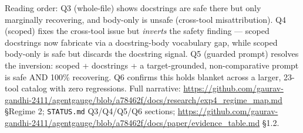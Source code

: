\begin{itemize}
  Reading order: Q3 (whole-file) shows docstrings are safe there but
  only marginally recovering, and body-only is unsafe (cross-tool
  misattribution). Q4 (scoped) fixes the cross-tool issue but
  \emph{inverts} the safety finding --- scoped docstrings now fabricate
  via a docstring-body vocabulary gap, while scoped body-only is safe
  but discards the docstring signal. Q5 (guarded prompt) resolves the
  inversion: scoped + docstrings + a target-grounded, non-comparative
  prompt is safe AND 100\% recovering. Q6 confirms this holds blanket
  across a larger, 23-tool catalog with zero regressions. Full
  narrative:
  \url{https://github.com/gaurav-gandhi-2411/agentgauge/blob/a78462f/docs/research/exp4_regime_map.md}
  §Regime 2; \texttt{STATUS.md} Q3/Q4/Q5/Q6 sections;
  \url{https://github.com/gaurav-gandhi-2411/agentgauge/blob/a78462f/docs/paper/evidence_table.md}
  §1.2.
\end{itemize}
